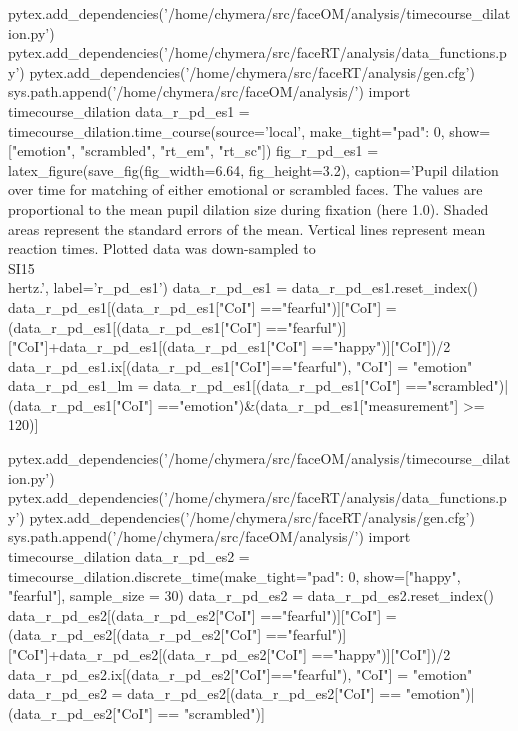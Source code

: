 \begin{pycode}[r_pd_es1]
pytex.add_dependencies('/home/chymera/src/faceOM/analysis/timecourse_dilation.py')
pytex.add_dependencies('/home/chymera/src/faceRT/analysis/data_functions.py')
pytex.add_dependencies('/home/chymera/src/faceRT/analysis/gen.cfg')
sys.path.append('/home/chymera/src/faceOM/analysis/')
import timecourse_dilation
data_r_pd_es1 = timecourse_dilation.time_course(source='local', make_tight={"pad": 0}, show=["emotion", "scrambled", "rt_em", "rt_sc"])
fig_r_pd_es1 = latex_figure(save_fig(fig_width=6.64, fig_height=3.2), caption='Pupil dilation over time for matching of either emotional or scrambled faces. The values are proportional to the mean pupil dilation size during fixation (here 1.0). Shaded areas represent the standard errors of the mean. Vertical lines represent mean reaction times. Plotted data was down-sampled to \\SI{15}{\\hertz}.', label='r_pd_es1')
data_r_pd_es1 = data_r_pd_es1.reset_index()
data_r_pd_es1[(data_r_pd_es1["CoI"] =="fearful")]["CoI"] = (data_r_pd_es1[(data_r_pd_es1["CoI"] =="fearful")]["CoI"]+data_r_pd_es1[(data_r_pd_es1["CoI"] =="happy")]["CoI"])/2
data_r_pd_es1.ix[(data_r_pd_es1["CoI"]=="fearful"), "CoI"] = "emotion"
data_r_pd_es1_lm = data_r_pd_es1[(data_r_pd_es1["CoI"] =="scrambled")|(data_r_pd_es1["CoI"] =="emotion")&(data_r_pd_es1["measurement"] >= 120)]
\end{pycode}
\begin{pycode}[r_pd_es2]
pytex.add_dependencies('/home/chymera/src/faceOM/analysis/timecourse_dilation.py')
pytex.add_dependencies('/home/chymera/src/faceRT/analysis/data_functions.py')
pytex.add_dependencies('/home/chymera/src/faceRT/analysis/gen.cfg')
sys.path.append('/home/chymera/src/faceOM/analysis/')
import timecourse_dilation
data_r_pd_es2 = timecourse_dilation.discrete_time(make_tight={"pad": 0}, show=["happy", "fearful"], sample_size = 30)
data_r_pd_es2 = data_r_pd_es2.reset_index()
data_r_pd_es2[(data_r_pd_es2["CoI"] =="fearful")]["CoI"] = (data_r_pd_es2[(data_r_pd_es2["CoI"] =="fearful")]["CoI"]+data_r_pd_es2[(data_r_pd_es2["CoI"] =="happy")]["CoI"])/2
data_r_pd_es2.ix[(data_r_pd_es2["CoI"]=="fearful"), "CoI"] = "emotion"
data_r_pd_es2 = data_r_pd_es2[(data_r_pd_es2["CoI"] == "emotion")|(data_r_pd_es2["CoI"] == "scrambled")]
\end{pycode}
